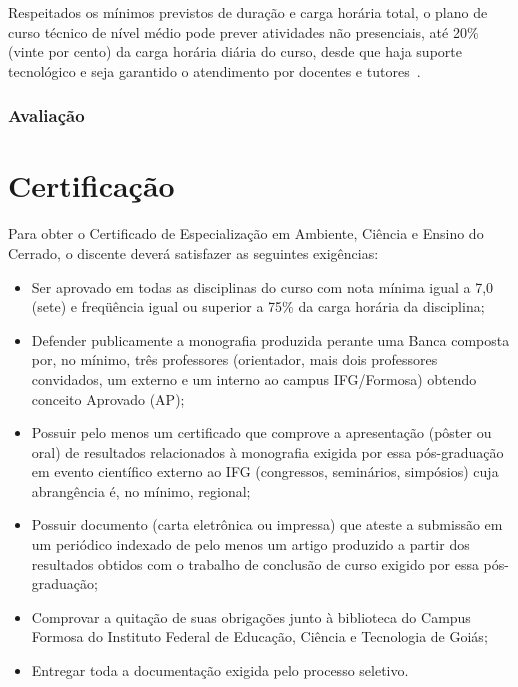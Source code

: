 \documentclass[11pt,fleqn]{book} %
\begin{document}
Respeitados os mínimos previstos de duração e carga horária total, o plano de curso técnico de nível médio pode prever atividades não presenciais, até 20\% (vinte por cento) da carga horária diária do curso, desde que haja suporte tecnológico e seja garantido o atendimento por docentes e tutores~\cite{Resolucao06De2012}.

\subsubsection{Avaliação}


\section{Certificação}
\indent

Para obter o Certificado de Especialização em Ambiente, Ciência e Ensino do Cerrado, o discente deverá satisfazer as seguintes exigências:
\begin{itemize}
	\item Ser aprovado em todas as disciplinas do curso com nota mínima igual a 7,0 (sete) e freqüência igual ou superior a 75\% da carga horária da disciplina;
	\item Defender publicamente a monografia produzida perante uma Banca composta por, no mínimo, três professores (orientador, mais dois professores convidados, um externo e um interno ao campus IFG/Formosa) obtendo conceito Aprovado (AP);
	\item Possuir pelo menos um certificado que comprove a apresentação (pôster ou oral) de resultados relacionados à monografia exigida por essa pós-graduação em evento científico externo ao IFG (congressos, seminários, simpósios) cuja abrangência é, no mínimo, regional;
	\item Possuir documento (carta eletrônica ou impressa) que ateste a submissão em um periódico indexado de pelo menos um artigo produzido a partir dos resultados obtidos com o trabalho de conclusão de curso exigido por essa pós-graduação;
	\item Comprovar a quitação de suas obrigações junto à biblioteca do Campus Formosa do Instituto Federal de Educação, Ciência e Tecnologia de Goiás;
	\item Entregar toda a documentação exigida pelo processo seletivo.
\end{itemize}
\end{document}
